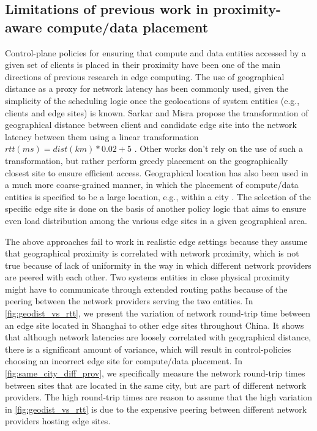 \subsection{Limitations of previous work in proximity-aware compute/data placement}
Control-plane policies for ensuring that compute and data entities accessed by a given set of clients is placed in their proximity have been one of the main directions of previous research in edge computing. The use of geographical distance as a proxy for network latency has been commonly used, given the simplicity of the scheduling logic once the geolocations of system entities (e.g., clients and edge sites) is known. Sarkar and Misra \cite{sarkar2016theoretical} propose the transformation of geographical distance between client and candidate edge site into the network latency between them using a linear transformation $rtt\left(ms\right) = dist \left(km\right) * 0.02 + 5$ \cite{qureshi2010power}. Other works don't rely on the use of such a transformation, but rather perform greedy placement on the geographically closest site to ensure efficient access. Geographical location has also been used in a much more coarse-grained manner, in which the placement of compute/data entities is specified to be a large location, e.g., within a city \cite{vilaccageolocate}. The selection of the specific edge site is done on the basis of another policy logic that aims to ensure even load distribution among the various edge sites in a given geographical area.
\par The above approaches fail to work in realistic edge settings because they assume that geographical proximity is correlated with network proximity, which is not true because of lack of uniformity in the way in which different network providers are peered with each other. Two systems entities in close physical proximity might have to communicate through extended routing paths because of the peering between the network providers serving the two entities. In \cref{fig:geodist_vs_rtt}, we present the variation of network round-trip time between an edge site located in Shanghai to other edge sites throughout China. It shows that although network latencies are loosely correlated with geographical distance, there is a significant amount of variance, which will result in control-policies choosing an incorrect edge site for compute/data placement. In \cref{fig:same_city_diff_prov}, we specifically measure the network round-trip times between sites that are located in the same city, but are part of different network providers. The high round-trip times are reason to assume that the high variation in \cref{fig:geodist_vs_rtt} is due to the expensive peering between different network providers hosting edge sites. 
